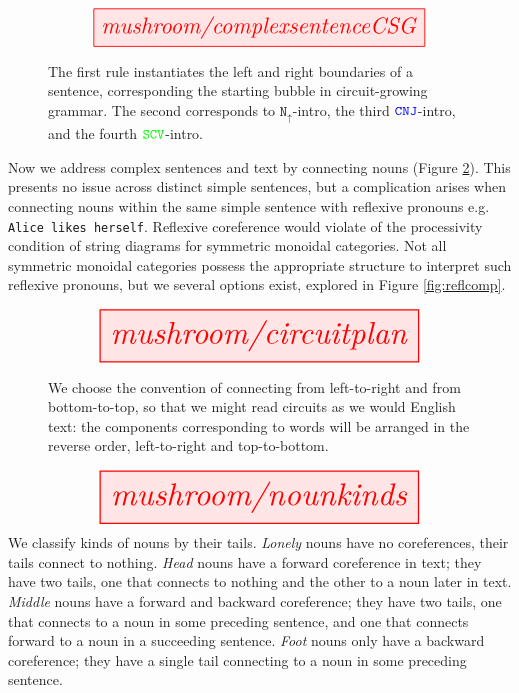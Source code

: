 \begin{figure}[h!]\label{fig:compsentCSG}
\centering
\[
\resizebox{0.75\textwidth}{!}{\tikzfig{mushroom/complexsentenceCSG}}
\]
\caption{
The first rule instantiates the left and right boundaries of a sentence, corresponding the starting bubble in circuit-growing grammar. The second corresponds to $\texttt{N}_\uparrow$-intro, the third $\textcolor{blue}{\texttt{CNJ}}$-intro, and the fourth $\textcolor{green}{\texttt{SCV}}$-intro.
}
\end{figure}

Now we address complex sentences and text by connecting nouns (Figure \ref{fig:nounconnection}). This presents no issue across distinct simple sentences, but a complication arises when connecting nouns within the same simple sentence with reflexive pronouns e.g. \texttt{Alice likes herself}. Reflexive coreference would violate of the processivity condition of string diagrams for symmetric monoidal categories. Not all symmetric monoidal categories possess the appropriate structure to interpret such reflexive pronouns, but we several options exist, explored in Figure \ref{fig:reflcomp}.

\begin{figure}[h!]\label{fig:nounconnection}
\centering
\[
\resizebox{0.75\textwidth}{!}{\tikzfig{mushroom/circuitplan}}
\]
\caption{We choose the convention of connecting from left-to-right and from bottom-to-top, so that we might read circuits as we would English text: the components corresponding to words will be arranged in the reverse order, left-to-right and top-to-bottom.}
\end{figure}

\begin{term}\label{term:nounkinds}
\[
\resizebox{0.75\textwidth}{!}{\tikzfig{mushroom/nounkinds}}
\]
We classify kinds of nouns by their tails. \emph{Lonely} nouns have no coreferences, their tails connect to nothing. \emph{Head} nouns have a forward coreference in text; they have two tails, one that connects to nothing and the other to a noun later in text. \emph{Middle} nouns have a forward and backward coreference; they have two tails, one that connects to a noun in some preceding sentence, and one that connects forward to a noun in a succeeding sentence. \emph{Foot} nouns only have a backward coreference; they have a single tail connecting to a noun in some preceding sentence.
\end{term}


